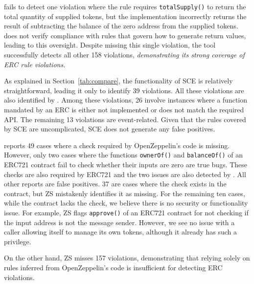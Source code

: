 \Tool{} fails to detect one violation 
where the rule requires \texttt{totalSupply()} to return the total quantity of 
supplied tokens, but the implementation incorrectly returns the result of 
subtracting the balance of the zero address from the supplied tokens. 
\Tool{} does not verify compliance with  
rules that govern how to generate return values, leading to this oversight. 
Despite missing this single violation, 
the tool successfully detects all other 158 violations, \textit{demonstrating its strong coverage of ERC rule violations.}










As explained in Section~\ref{tab:compare}, 
the functionality of SCE is relatively 
straightforward, leading it only to identify 39 violations. 
All these violations are also identified by 
\Tool{}. 
Among these violations, 26 involve 
instances where a function mandated by an ERC is 
either not implemented or does not match the required API.
The remaining 13 violations are 
event-related. Given that the rules covered by SCE 
are uncomplicated, SCE does not generate any false positives.

reports 49 cases where a check required by OpenZeppelin's code is missing. However, only two cases
 where the functions \texttt{ownerOf()} and \texttt{balanceOf()} 
of an ERC721 contract fail to check whether their inputs are zero are true bugs. 
These checks are also required by ERC721 and the two issues are also 
detected by \Tool{}. All other reports are false positives. 
37 are cases where the check exists in the contract, 
but ZS mistakenly identifies it as missing. 
For the remaining ten cases, while the contract lacks the check, 
we believe there is no security or functionality issue. For example, ZS 
flags \texttt{approve()} of an ERC721 contract for not checking if the 
input address is not the message sender. 
However, we see no issue with a caller allowing itself to manage its own tokens, although 
it already has such a privilege.

On the other hand, ZS misses 157 violations, 
demonstrating that relying solely on rules inferred from 
OpenZeppelin’s code is insufficient for detecting ERC violations.




